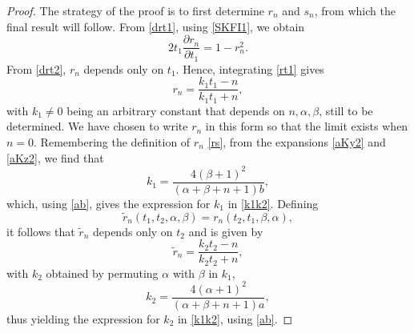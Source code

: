 \documentclass[10pt,a4paper]{amsart}
\begin{document}
\begin{proof}
The strategy of the proof is to first determine $r_n$ and $s_n$, from which the final result will follow. From \eqref{drt1}, using \eqref{SKFI1}, we obtain 
\begin{equation} 
2t_1\frac{\partial r_n}{\partial t_1}=1-r_n^2.\label{rt1}
\end{equation}
From \eqref{drt2}, $r_n$ depends only on $t_1$. Hence, integrating \eqref{rt1} gives
\begin{equation}
r_n=\frac{k_1t_1-n}{k_1t_1+n},\label{solr}
\end{equation}
with $k_1\neq 0$ being an arbitrary constant that depends on $n,\alpha, \beta$, still to be determined. We have chosen to write $r_n$ in this form so that the limit exists when $n=0$. Remembering the definition of $r_n$ \eqref{rs}, from the expansions \eqref{aKy2} and \eqref{aKz2}, we find that
\begin{equation} \label{k1}
k_1=\frac{4(\beta+1)^2}{(\alpha+\beta+n+1)b},
\end{equation} 
which, using \eqref{ab}, gives the expression for $k_1$ in \eqref{k1k2}. Defining
\begin{equation*}
\tilde{r}_n(t_1,t_2,\alpha,\beta)=r_n(t_2,t_1,\beta,\alpha),
\end{equation*}
it follows that $\tilde{r}_n$ depends only on $t_2$ and is given by
\begin{equation}\label{trt2}
\tilde{r}_n=\frac{k_2t_2-n}{k_2t_2+n},
\end{equation}
with $k_2$ obtained by permuting $\alpha$ with $\beta$ in $k_1$,
\begin{equation}\label{k2}
k_2=\frac{4(\alpha+1)^2}{(\alpha+\beta+n+1)a},
\end{equation}
thus yielding the expression for $k_2$ in \eqref{k1k2}, using \eqref{ab}.


\end{proof}
\end{document}
